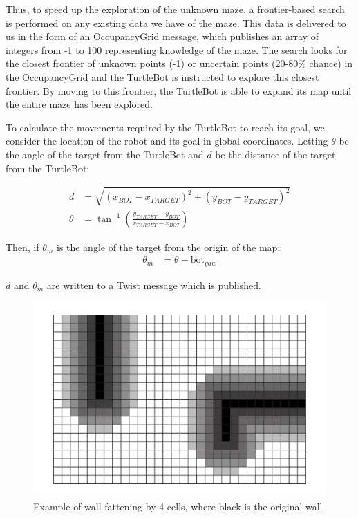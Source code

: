 \documentclass[titlepage,12pt,a4paper]{article}
\begin{document}
Thus, to speed up the exploration of the unknown maze, a frontier-based search is performed on any existing data we have of the maze. This data is delivered to us in the form of an OccupancyGrid message, which publishes an array of integers from -1 to 100 representing knowledge of the maze. The search looks for the closest frontier of unknown points (-1) or uncertain points (20-80\% chance) in the OccupancyGrid and the TurtleBot is instructed to explore this closest frontier. By moving to this frontier, the TurtleBot is able to expand its map until the entire maze has been explored. 

To calculate the movements required by the TurtleBot to reach its goal, we consider the location of the robot and its goal in global coordinates. Letting $\theta$ be the angle of the target from the TurtleBot and $d$ be the distance of the target from the TurtleBot:

\begin{align*}
	d			&=	\sqrt{(x_{BOT} - x_{TARGET})^2 + (y_{BOT} - y_{TARGET})^2} \\
	\theta		&=	\tan^{-1}{(\frac{y_{TARGET} - y_{BOT}}{x_{TARGET} - x_{BOT}})} 
\end{align*}

Then, if $\theta_m$ is the angle of the target from the origin of the map:
\begin{align*}
		\theta_m 	&=	\theta - \text{bot}_{yaw} 
\end{align*}

$d$ and $\theta_m$ are written to a Twist message which is published.

\begin{figure}[h]
	\begin{center}
	\includegraphics[scale=0.25]{wallfatten.jpg}
	\caption{Example of wall fattening by 4 cells, where black is the original wall}
	\end{center}
\end{figure}
\end{document}
